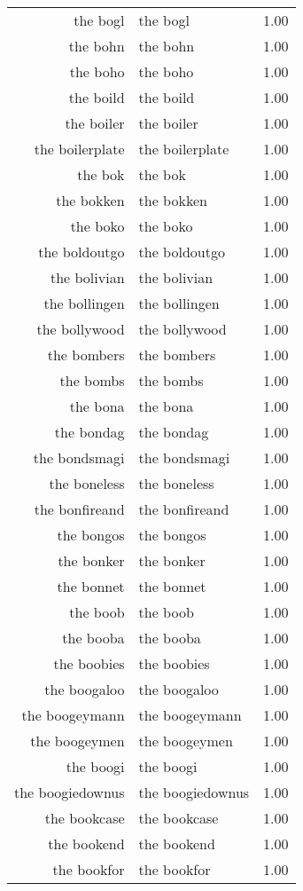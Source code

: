 \begin{table}[ht]
\begin{tabular}{rlr}
  the bogl & the bogl & 1.00 \\ 
  the bohn & the bohn & 1.00 \\ 
  the boho & the boho & 1.00 \\ 
  the boild & the boild & 1.00 \\ 
  the boiler & the boiler & 1.00 \\ 
  the boilerplate & the boilerplate & 1.00 \\ 
  the bok & the bok & 1.00 \\ 
  the bokken & the bokken & 1.00 \\ 
  the boko & the boko & 1.00 \\ 
  the boldoutgo & the boldoutgo & 1.00 \\ 
  the bolivian & the bolivian & 1.00 \\ 
  the bollingen & the bollingen & 1.00 \\ 
  the bollywood & the bollywood & 1.00 \\ 
  the bombers & the bombers & 1.00 \\ 
  the bombs & the bombs & 1.00 \\ 
  the bona & the bona & 1.00 \\ 
  the bondag & the bondag & 1.00 \\ 
  the bondsmagi & the bondsmagi & 1.00 \\ 
  the boneless & the boneless & 1.00 \\ 
  the bonfireand & the bonfireand & 1.00 \\ 
  the bongos & the bongos & 1.00 \\ 
  the bonker & the bonker & 1.00 \\ 
  the bonnet & the bonnet & 1.00 \\ 
  the boob & the boob & 1.00 \\ 
  the booba & the booba & 1.00 \\ 
  the boobies & the boobies & 1.00 \\ 
  the boogaloo & the boogaloo & 1.00 \\ 
  the boogeymann & the boogeymann & 1.00 \\ 
  the boogeymen & the boogeymen & 1.00 \\ 
  the boogi & the boogi & 1.00 \\ 
  the boogiedownus & the boogiedownus & 1.00 \\ 
  the bookcase & the bookcase & 1.00 \\ 
  the bookend & the bookend & 1.00 \\ 
  the bookfor & the bookfor & 1.00 \\ 

\end{tabular}
\end{table}
